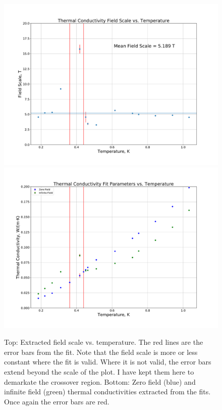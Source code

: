 \documentclass{thesis-umich}
\begin{document}
\begin{figure}
	\centering
	\caption[SCBO Fitting Parameters vs. Temperature]{Top: Extracted field scale vs. temperature. The red lines are the error bars from the fit. Note that the field scale is more or less constant where the fit is valid. Where it is not valid, the error bars extend beyond the scale of the plot. I have kept them here to demarkate the crossover region. Bottom: Zero field (blue) and infinite field (green) thermal conductivities extracted from the fits. Once again the error bars are red.}
	\label{fig:SCBO_fit_params}
	\includegraphics[width=0.9\columnwidth,trim={1cm 1cm 1cm 1cm},clip]{figures/SCBO_field_scale.pdf}
	\includegraphics[width=0.9\columnwidth,trim={1cm 1cm 1cm 1cm},clip]{figures/SCBO_tcond_params.pdf}
\end{figure}
\end{document}
